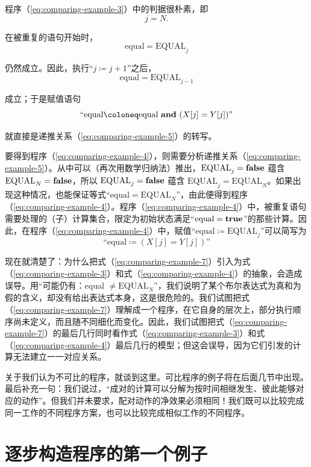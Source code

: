\documentclass[twoside,11pt,fontset=none]{ctexbook}
\begin{document}
程序（\ref{eq:comparing-example-3}）中的判据很朴素，即
$$
j = N.
$$

\noindent
在被重复的语句开始时，
$$
\text{equal} = \text{EQUAL}_j
$$

\noindent
仍然成立。因此，执行“$j \coloneq j + 1$”之后，
$$
\text{equal} = \text{EQUAL}_{j-1}
$$

\noindent
成立；于是赋值语句
$$
\text{``equal} \coloneq \text{equal \textbf{and} } (X[j] = Y[j])\text{''}
$$

\noindent
就直接是递推关系（\ref{eq:comparing-example-5}）的转写。

要得到程序（\ref{eq:comparing-example-4}），则需要分析递推关系（\ref{eq:comparing-example-5}）。从中可以（再次用数学归纳法）推出，$\text{EQUAL}_j = \text{\textbf{false}}$ 蕴含 $\text{EQUAL}_N = \text{\textbf{false}}$，所以 $\text{EQUAL}_j = \text{\textbf{false}}$ 蕴含 $\text{EQUAL}_j = \text{EQUAL}_N$。如果出现这种情况，也能保证等式“$\text{equal} = \text{EQUAL}_N$”，由此便得到程序（\ref{eq:comparing-example-4}）。程序（\ref{eq:comparing-example-4}）中，被重复语句需要处理的（子）计算集合，限定为初始状态满足“$\text{equal} = \text{\textbf{true}}$”的那些计算。因此，在程序（\ref{eq:comparing-example-4}）中，赋值“$\text{equal} \coloneq \text{EQUAL}_j$”可以简写为
$$
\text{``equal} \coloneq (X[j] = Y[j])\text{''}
$$

现在就清楚了：为什么把式（\ref{eq:comparing-example-7}）引入为式（\ref{eq:comparing-example-3}）和式（\ref{eq:comparing-example-4}）的抽象，会造成误导。用“可能仍有：equal $\neq \text{EQUAL}_N$”，我们说明了某个布尔表达式为真和为假的含义，却没有给出表达式本身，这是很危险的。我们试图把式（\ref{eq:comparing-example-7}）理解成一个程序，在它自身的层次上，部分执行顺序尚未定义，而且随不同细化而变化。因此，我们试图把式（\ref{eq:comparing-example-7}）的最后几行同时看作式（\ref{eq:comparing-example-3}）和式（\ref{eq:comparing-example-4}）最后几行的模型；但这会误导，因为它们引发的计算无法建立一一对应关系。

关于我们认为不可比的程序，就谈到这里。可比程序的例子将在后面几节中出现。最后补充一句：我们说过，“成对的计算可以分解为按时间相继发生、彼此能够对应的动作”。但我们并未要求，配对动作的净效果必须相同！我们既可以比较完成同一工作的不同程序方案，也可以比较完成相似工作的不同程序。

\section[逐步构造程序的第一个例子]{逐步构造程序的第一个例子}
\label{sec:first-example-step-wise-program-composition}
\end{document}
